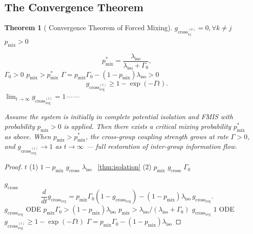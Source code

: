 \documentclass[11pt,a4paper]{article}
\newtheorem{theorem}{Theorem}[section]
\theoremstyle{remark}
\newcommand{\ISOLambda}{\lambda_{\text{iso}}}
\newcommand{\GCoupling}{g_{\text{cross}}}
\begin{document}
\subsection{}

\subsection{The Convergence Theorem}

\begin{theorem}[ Convergence Theorem of Forced Mixing]
\label{thm:convergence}
$\GCoupling_{kj}^{(0)} = 0, \forall k \neq j$
 $p_{\text{mix}} > 0$ 

\[
p_{\text{mix}}^* = \frac{\ISOLambda}{\ISOLambda + \Gamma_0},
\]
 $\Gamma_0 > 0$ 
 $p_{\text{mix}} > p_{\text{mix}}^*$ 
 $\Gamma = p_{\text{mix}}\Gamma_0 - (1-p_{\text{mix}})\ISOLambda > 0$ 
\[
\GCoupling_{\text{avg}}^{(t)} \geq 1 - \exp(-\Gamma t).
\]
$\lim_{t \to \infty} \GCoupling_{\text{avg}}^{(t)} = 1$——


Assume the system is initially in complete potential isolation and FMIS with probability
$p_{\text{mix}} > 0$ is applied. Then there exists a critical mixing probability
$p_{\text{mix}}^*$ as above. When $p_{\text{mix}} > p_{\text{mix}}^*$, the cross-group
coupling strength grows at rate $\Gamma > 0$, and $\GCoupling_{\text{avg}}^{(t)} \to 1$
as $t \to \infty$ --- full restoration of inter-group information flow.
\end{theorem}

\begin{proof}
 $t$
(1)  $1-p_{\text{mix}}$  $\GCoupling$  $\ISOLambda$ 
~\ref{thm:isolation}
(2)  $p_{\text{mix}}$  $\GCoupling$  $\Gamma_0$ 

 $\GCoupling$ 
\[
\frac{d}{dt} \GCoupling_{\text{avg}} =
p_{\text{mix}} \Gamma_0 (1 - \GCoupling_{\text{avg}}) -
(1-p_{\text{mix}}) \ISOLambda \, \GCoupling_{\text{avg}}.
\]
 $\GCoupling_{\text{avg}}$  ODE
 $p_{\text{mix}} \Gamma_0 > (1-p_{\text{mix}})\ISOLambda$ 
$p_{\text{mix}} > \ISOLambda/(\ISOLambda + \Gamma_0)$ 
$\GCoupling_{\text{avg}}$  $1$ 
 ODE  $\GCoupling_{\text{avg}}^{(t)} \geq 1 - \exp(-\Gamma t)$
 $\Gamma = p_{\text{mix}}\Gamma_0 - (1-p_{\text{mix}})\ISOLambda$
\end{proof}
\end{document}

